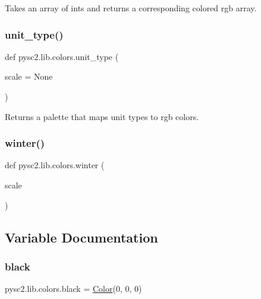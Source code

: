 \begin{DoxyVerb}Takes an array of ints and returns a corresponding colored rgb array.\end{DoxyVerb}
 \mbox{\label{namespacepysc2_1_1lib_1_1colors_ae0af5a08f5570f8eb5b2b66fcf26ea15}} 
\subsubsection{\texorpdfstring{unit\+\_\+type()}{unit\_type()}}
{\footnotesize\ttfamily def pysc2.\+lib.\+colors.\+unit\+\_\+type (\begin{DoxyParamCaption}\item[{}]{scale = {\ttfamily None} }\end{DoxyParamCaption})}

\begin{DoxyVerb}Returns a palette that maps unit types to rgb colors.\end{DoxyVerb}
 \mbox{\label{namespacepysc2_1_1lib_1_1colors_ac3ee96fe4f9d521165e949a436b76968}} 
\subsubsection{\texorpdfstring{winter()}{winter()}}
{\footnotesize\ttfamily def pysc2.\+lib.\+colors.\+winter (\begin{DoxyParamCaption}\item[{}]{scale }\end{DoxyParamCaption})}



\subsection{Variable Documentation}
\mbox{\label{namespacepysc2_1_1lib_1_1colors_a37add41a750e4e281c149ca0b1e26171}} 
\subsubsection{\texorpdfstring{black}{black}}
{\footnotesize\ttfamily pysc2.\+lib.\+colors.\+black = \mbox{\hyperlink{classpysc2_1_1lib_1_1colors_1_1_color}{Color}}(0, 0, 0)}

